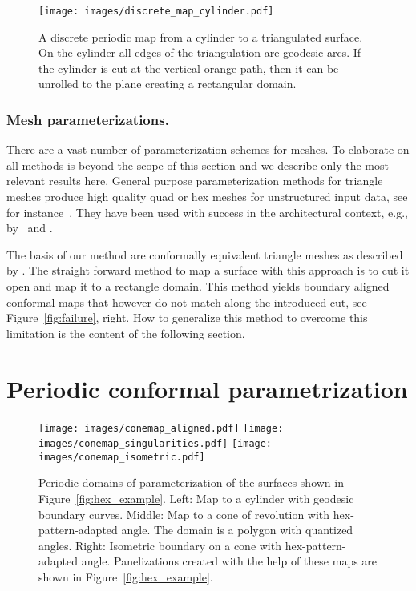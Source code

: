 \documentclass[Thesis.tex]{subfiles}
\begin{document}
\begin{figure}[tb]
\centering
\texttt{[image: images/discrete\_map\_cylinder.pdf]}
\caption{A discrete periodic map from a cylinder to a triangulated
  surface.  On the cylinder all edges of the triangulation are
  geodesic arcs. If the cylinder is cut at the vertical orange path,
  then it can be unrolled to the plane creating a rectangular domain.}
\label{fig:discrete_map}
\end{figure}

\subsubsection{Mesh parameterizations.}
There are a vast number of parameterization schemes for meshes. To
elaborate on all methods is beyond the scope of this section and we
describe only the most relevant results here. General purpose
parameterization methods for triangle meshes produce high quality quad
or hex meshes for unstructured input data, see for
instance~\cite{BommesZK2009, AlexaCL2000, Springborn2008}. They have been used with
success in the architectural context, e.g., by~\cite{BoPKWW2011} and
\cite{Sechelmann2012}.

The basis of our method are conformally equivalent triangle meshes as
described by \cite{Springborn2008}. The straight forward method to map a
surface with this approach is to cut it open and map it to a rectangle
domain. This method yields boundary aligned conformal maps that
however do not match along the introduced cut, see
Figure~\ref{fig:failure}, right. How to generalize this method to
overcome this limitation is the content of the following section.


\section{Periodic conformal parametrization}
\label{sec:conformal-parameterization}

\begin{figure}[tb]
  \centering
  \texttt{[image: images/conemap\_aligned.pdf]}
  \texttt{[image: images/conemap\_singularities.pdf]}
  \texttt{[image: images/conemap\_isometric.pdf]}
  \caption{Periodic domains of parameterization of the surfaces shown
    in Figure~\ref{fig:hex_example}.  Left: Map to a cylinder with
    geodesic boundary curves. Middle: Map to a cone of revolution with
    hex-pattern-adapted angle. The domain is a polygon with quantized
    angles. Right: Isometric boundary on a cone with
    hex-pattern-adapted angle.  Panelizations created with the help of
    these maps are shown in Figure~\ref{fig:hex_example}.}
  \label{fig:cone_maps_teaser}
\end{figure}
\end{document}
